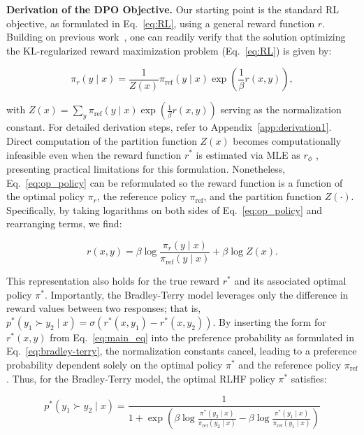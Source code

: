 \textbf{Derivation of the DPO Objective.} Our starting point is the standard RL objective, as formulated in Eq.~\ref{eq:RL}, using a general reward function $r$. Building on previous work~\citep{peters2007reinforcement, peng2019advantage, korbak2022reinforcement, go2023aligning}, one can readily verify that the solution optimizing the KL-regularized reward maximization problem (Eq.~\ref{eq:RL}) is given by:

\begin{equation}\label{eq:op_policy}
    \pi_r(y\mid x) = \frac{1}{Z(x)}\pi_\text{ref}(y\mid x)\exp\left(\frac{1}{\beta}r(x, y)\right),
\end{equation}

with $Z(x) =\sum_{y}\pi_\text{ref}(y\mid x)\exp\left(\frac{1}{\beta}r(x, y)\right)$ serving as the normalization constant. For detailed derivation steps, refer to Appendix~\ref{app:derivation1}. Direct computation of the partition function $Z(x)$ becomes computationally infeasible even when the reward function $r^*$ is estimated via MLE as $r_{\phi}$ \citep{korbak2022reinforcement, go2023aligning}, presenting practical limitations for this formulation. Nonetheless, Eq.~\ref{eq:op_policy} can be reformulated so the reward function is a function of the optimal policy $\pi_r$, the reference policy $\pi_\text{ref}$, and the partition function $Z(\cdot)$. Specifically, by taking logarithms on both sides of Eq.~\ref{eq:op_policy} and rearranging terms, we find:

\begin{equation}\label{eq:main_eq}
    r(x,y) =\beta \log \frac{\pi_r(y\mid x)}{\pi_\text{ref}(y\mid x)} + \beta \log Z(x).
\end{equation}

This representation also holds for the true reward $r^*$ and its associated optimal policy $\pi^*$. Importantly, the Bradley-Terry model leverages only the difference in reward values between two responses; that is, ${p^*(y_1 \succ y_2 \mid x) = \sigma(r^*(x, y_1) - r^*(x, y_2))}$. By inserting the form for $r^*(x, y)$ from Eq.~\ref{eq:main_eq} into the preference probability as formulated in Eq.~\ref{eq:bradley-terry}, the normalization constants cancel, leading to a preference probability dependent solely on the optimal policy $\pi^*$ and the reference policy $\pi_\text{ref}$. Thus, for the Bradley-Terry model, the optimal RLHF policy $\pi^*$ satisfies:

\begin{equation}\label{eq:objective}
    p^*(y_1\succ y_2 \mid x)=\frac{1}{1 + \exp\left(\beta \log \frac{\pi^*(y_2\mid x)}{\pi_\text{ref}(y_2\mid x)} - \beta \log \frac{\pi^*(y_1\mid x)}{\pi_\text{ref}(y_1\mid x)}\right)}
\end{equation}

